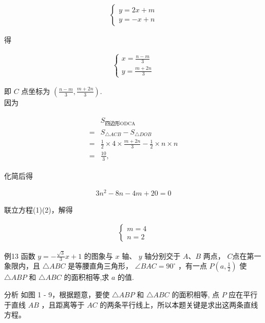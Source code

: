\documentclass[10pt]{article}
\begin{document}
\begin{align*}
\left\{\begin{array}{l}
y=2 x+m \\
y=-x+n
\end{array}\right.
\end{align*}

得

\begin{align*}
\left\{\begin{array}{l}
x=\frac{n-m}{3} \\
y=\frac{m+2 n}{3}
\end{array}\right.
\end{align*}

即 $C$ 点坐标为 $\left(\frac{n-m}{3}, \frac{m+2 n}{3}\right)$.\\
因为

\begin{align*}
\begin{aligned}
& S_{\text {四边形ODCA }} \\
= & S_{\triangle A C B}-S_{\triangle D O B} \\
= & \frac{1}{2} \times 4 \times \frac{m+2 n}{3}-\frac{1}{2} \times n \times n \\
= & \frac{10}{3},
\end{aligned}
\end{align*}

化简后得

\begin{align*}
3 n^{2}-8 n-4 m+20=0 \tag{2}
\end{align*}

联立方程(1)(2)，解得

\begin{align*}
\left\{\begin{array}{l}
m=4 \\
n=2
\end{array}\right.
\end{align*}

例13 函数 $y=-\frac{\sqrt{3}}{3} x+1$ 的图象与 $x$ 轴、 $y$ 轴分别交于 $A 、 B$ 两点， $C$点在第一象限内，且 $\triangle A B C$ 是等腰直角三角形， $\angle B A C=90^{\circ}$ ，有一点 $P\left(a, \frac{1}{2}\right)$ 使 $\triangle A B P$ 和 $\triangle A B C$ 的面积相等,求 $a$ 的值.

分析 如图 1 - 9，根据题意，要使 $\triangle A B P$ 和 $\triangle A B C$ 的面积相等, 点 $P$ 应在平行于直线 $A B$ ，且距离等于 $A C$ 的两条平行线上，所以本题关键是求出这两条直线方程。
\end{document}
